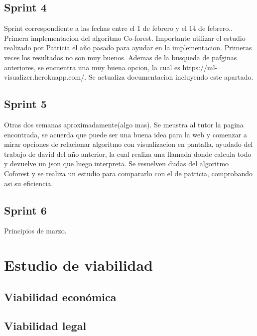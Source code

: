 \subsection{Sprint 4}
Sprint correspondiente a las fechas entre el 1 de febrero y el 14 de febrero.. Primera implementacion del algoritmo Co-forest. Importante utilizar el estudio realizado por Patricia el año pasado para ayudar en la implementacion. Primeras veces los resultados no son muy buenos. Ademas de la busqueda de pafginas anteriores, se encuentra una muy buena opcion, la cual es https://ml-visualizer.herokuapp.com/. Se actualiza documentacion incluyendo este apartado.

\subsection{Sprint 5}
Otras dos semanas aproximadamente(algo mas). Se meustra al tutor la pagina encontrada, se acuerda que puede ser una buena idea para la web y comenzar a mirar opciones de relacionar algoritmo con visualizacion en pantalla, ayudado del trabajo de david del año anterior, la cual realiza una llamada donde calcula todo y devuelve un json que luego interpreta. Se resuelven dudas del algoritmo Coforest y se realiza un estudio para compararlo con el de patricia, comprobando asi su eficiencia.

\subsection{Sprint 6}
Principios de marzo. 

\section{Estudio de viabilidad}

\subsection{Viabilidad económica}

\subsection{Viabilidad legal}

